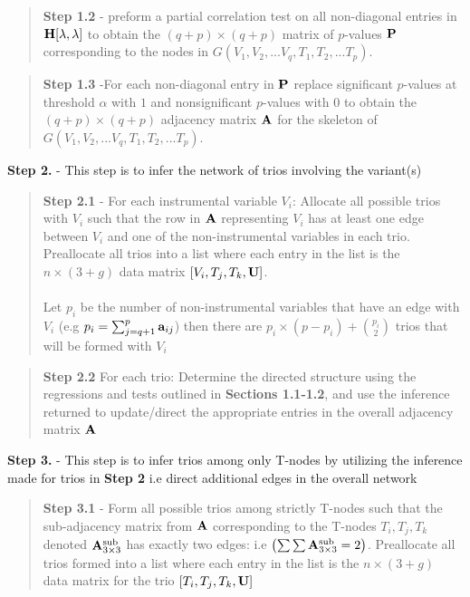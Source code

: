 \documentclass[12pt]{report}
\begin{document}
\begin{quote}
\textbf{Step 1.2} - preform a partial correlation test on all non-diagonal entries in ${\bf H}[\lambda, \lambda]$ to obtain the $(q+p) \times (q+p)$ matrix of $p$-values ${\bf P}$ corresponding to the nodes in  $G(V_1, V_2,...V_q, T_1, T_2, ... T_p)$. 
\end{quote}

\begin{quote}
\textbf{Step 1.3} -For each non-diagonal entry in $\bf P$ replace significant $p$-values at threshold $\alpha$ with $1$ and nonsignificant $p$-values with $0$ to obtain the $(q+p) \times (q+p)$ adjacency matrix $\bf A$ for the skeleton of $G(V_1, V_2,...V_q, T_1, T_2, ... T_p)$. \\
\end{quote}
\noindent \textbf{Step 2.} - This step is to infer the network of trios involving the variant(s) \\
\begin{quote}
\textbf{Step 2.1} - For each instrumental variable $V_i$: Allocate all possible trios with $V_i$ such that the row in $\bf A$ representing $V_i$ has at least one edge between $V_i$ and one of the non-instrumental variables in each trio. Preallocate all trios into a list where each entry in the list is the $n\times(3 +g)$ data matrix $[V_i,T_j,T_k, \bf{U}]$. \\
\\
 Let $p_i$ be the number of non-instrumental variables that have an edge with $V_i$ (e.g $p_i = \sum_{j=q+1}^p {\bf a}_{ij}$) then there are $p_i \times (p-p_i)+{p_i\choose2}$ trios that will be formed with $V_i$  \\
\end{quote}

\begin{quote}
\textbf{Step 2.2}
 For each trio: Determine the directed structure using the regressions and tests outlined in \textbf{Sections 1.1-1.2}, and use the inference returned to update/direct the appropriate entries in the overall adjacency matrix $\bf A$ 
\end{quote}

\noindent \textbf{Step 3.} - This step is to infer trios among only T-nodes by utilizing the inference made for trios in \textbf{Step 2} i.e direct additional edges in the overall network\\

\begin{quote}
\textbf{Step 3.1} - Form all possible trios among strictly T-nodes such that the sub-adjacency matrix from $\bf A$ corresponding to the T-nodes $T_i, T_j, T_k$ denoted ${\bf A}_{3\times3}^{\text{sub}}$ has exactly two edges: i.e $\left(\sum \sum {\bf A}_{3\times3}^{\text{sub}} = 2\right)$. Preallocate all trios formed  into a list where each entry in the list is the $n\times(3 +g)$ data matrix for the trio $[T_i,T_j,T_k, \bf{U}]$ \\
\end{quote}
\end{document}
